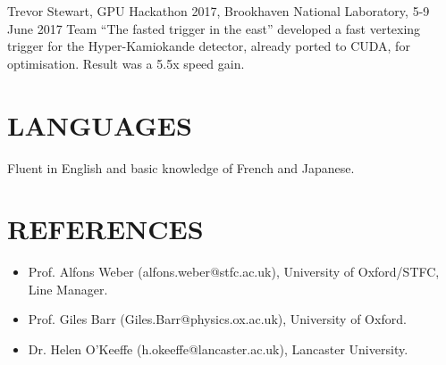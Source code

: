 \documentclass[margin]{res}
\begin{document}
\begin{resume}
Trevor Stewart, GPU Hackathon 2017, Brookhaven National Laboratory, 5-9 June 2017
Team ``The fasted trigger in the east'' developed a fast vertexing trigger for the Hyper-Kamiokande detector, already ported to CUDA, for optimisation. Result was a 5.5x speed gain. 

\section{LANGUAGES}

Fluent in English and basic knowledge of French and Japanese.

\section{REFERENCES}
\begin{itemize}
  \item Prof. Alfons Weber (alfons.weber@stfc.ac.uk), University of Oxford/STFC,\\ Line Manager. 
  \item Prof. Giles Barr (Giles.Barr@physics.ox.ac.uk), University of Oxford.
  \item Dr. Helen O'Keeffe (h.okeeffe@lancaster.ac.uk), Lancaster University.
\end{itemize}
\end{resume} 
\end{document}
